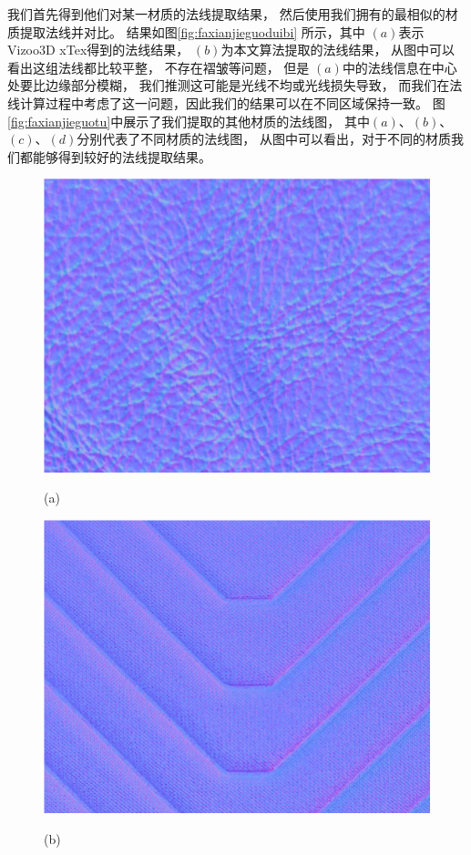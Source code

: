 我们首先得到他们对某一材质的法线提取结果，
然后使用我们拥有的最相似的材质提取法线并对比。
结果如图\ref{fig:faxianjieguoduibi}
所示，其中
$(a)$表示Vizoo3D xTex得到的法线结果，
$(b)$为本文算法提取的法线结果，
从图中可以看出这组法线都比较平整，
不存在褶皱等问题，
但是
$(a)$中的法线信息在中心处要比边缘部分模糊，
我们推测这可能是光线不均或光线损失导致，
而我们在法线计算过程中考虑了这一问题，因此我们的结果可以在不同区域保持一致。
图\ref{fig:faxianjieguotu}中展示了我们提取的其他材质的法线图，
其中$(a)$、$(b)$、$(c)$、$(d)$分别代表了不同材质的法线图，
从图中可以看出，对于不同的材质我们都能够得到较好的法线提取结果。
\begin{figure}[htbp]
\begin{minipage}{0.48\linewidth}
\centerline{\includegraphics[width=1.0\linewidth]{figures/faxianjieguotua.png}}
\centerline{(a)}
\end{minipage}
\begin{minipage}{0.48\linewidth}
\centerline{\includegraphics[width=1.0\linewidth]{figures/faxianjieguotub.png}}
\centerline{(b)}
\end{minipage}


\end{figure}
